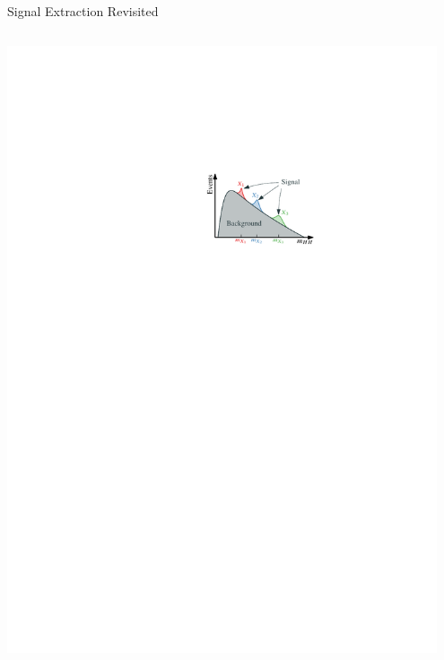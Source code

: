 \documentclass[11pt, xcolor={dvipsnames}, aspectratio=169, notes]{beamer}
\begin{document}
\begin{frame}{Signal Extraction Revisited}
\begin{columns}[onlytextwidth]
    \vspace*{2em}

    \hspace*{1em}\includegraphics[width=0.95\textwidth]{resonant_signal_extraction_illustration}
  \end{columns}
\end{frame}

\end{document}
